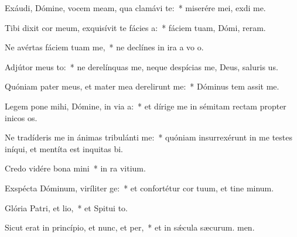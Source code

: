 \item Exáudi, Dómine, vocem meam, qua clamávi  te:~* miserére mei,  exdi me.
\item Tibi dixit cor meum, exquisívit te fácies a:~* fáciem tuam, Dómi, reram.
\item Ne avértas fáciem tuam  me,~* ne declínes in ira a vo o.
\item Adjútor meus to:~* ne derelínquas me, neque despícias me, Deus, saluris us.
\item Quóniam pater meus, et mater mea derelirunt me:~* Dóminus tem assit me.
\item Legem pone mihi, Dómine, in via a:~* et dírige me in sémitam rectam propter inicos os.
\item Ne tradíderis me in ánimas tribulánti me:~* quóniam insurrexérunt in me testes iníqui, et mentíta est inquitas bi.
\item Credo vidére bona mini~* in ra vitium.
\item Exspécta Dóminum, viríliter ge:~* et confortétur cor tuum, et tine minum.
\item Glória Patri, et lio,~* et Spitui to.
\item Sicut erat in princípio, et nunc, et per,~* et in sǽcula sæcurum. men.
